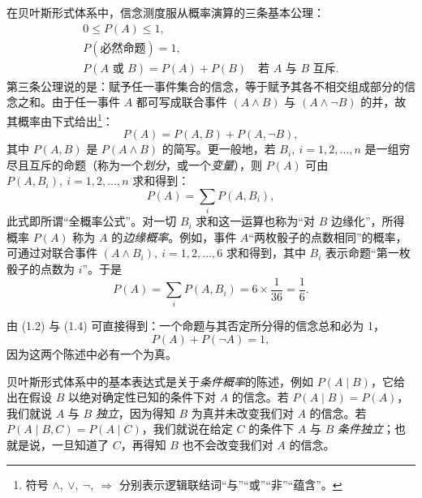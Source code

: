 在贝叶斯形式体系中，信念测度服从概率演算的三条基本公理：
\begin{gather}
0 \le P(A) \le 1, \tag{1.1}\\
P(\text{必然命题}) = 1, \tag{1.2}\\
P(A \text{ 或 } B) = P(A) + P(B)\quad\text{若 } A \text{ 与 } B \text{ 互斥}. \tag{1.3}
\end{gather}
第三条公理说的是：赋予任一事件集合的信念，等于赋予其各不相交组成部分的信念之和。由于任一事件 $A$ 都可写成联合事件 $(A\wedge B)$ 与 $(A\wedge\neg B)$ 的并，故其概率由下式给出\footnote{符号 $\wedge,\ \vee,\ \neg,\ \Rightarrow$ 分别表示逻辑联结词“与”“或”“非”“蕴含”。}：
\begin{equation}
P(A) = P(A,B) + P(A,\neg B), \tag{1.4}
\end{equation}
其中 $P(A,B)$ 是 $P(A\wedge B)$ 的简写。更一般地，若 $B_i,\ i=1,2,\dots,n$ 是一组穷尽且互斥的命题（称为一个\emph{划分}，或一个\emph{变量}），则 $P(A)$ 可由 $P(A,B_i),\ i=1,2,\dots,n$ 求和得到：
\begin{equation}
P(A) = \sum_i P(A,B_i), \tag{1.5}
\end{equation}
此式即所谓“全概率公式”。对一切 $B_i$ 求和这一运算也称为“对 $B$ 边缘化”，所得概率 $P(A)$ 称为 $A$ 的\emph{边缘概率}。例如，事件 $A$“两枚骰子的点数相同”的概率，可通过对联合事件 $(A\wedge B_i),\ i=1,2,\dots,6$ 求和得到，其中 $B_i$ 表示命题“第一枚骰子的点数为 $i$”。于是
\begin{equation}
P(A) = \sum_i P(A,B_i) = 6\times\frac{1}{36} = \frac{1}{6}. \tag{1.6}
\end{equation}

由 \textup{(1.2)} 与 \textup{(1.4)} 可直接得到：一个命题与其否定所分得的信念总和必为 1，
\begin{equation}
P(A) + P(\neg A) = 1, \tag{1.7}
\end{equation}
因为这两个陈述中必有一个为真。

贝叶斯形式体系中的基本表达式是关于\emph{条件概率}的陈述，例如 $P(A\mid B)$，它给出在假设 $B$ 以绝对确定性已知的条件下对 $A$ 的信念。若 $P(A\mid B)=P(A)$，我们就说 $A$ 与 $B$ \emph{独立}，因为得知 $B$ 为真并未改变我们对 $A$ 的信念。若 $P(A\mid B,C)=P(A\mid C)$，我们就说在给定 $C$ 的条件下 $A$ 与 $B$ \emph{条件独立}；也就是说，一旦知道了 $C$，再得知 $B$ 也不会改变我们对 $A$ 的信念。

